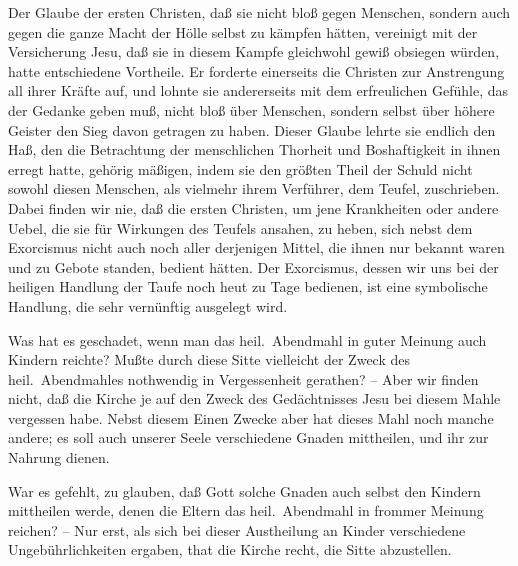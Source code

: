 \begin{aufza}
\item Der Glaube der ersten Christen, daß sie nicht bloß gegen Menschen, sondern auch gegen die ganze Macht der Hölle selbst zu kämpfen hätten, vereinigt mit der Versicherung Jesu, daß sie in diesem Kampfe gleichwohl gewiß obsiegen würden, hatte entschiedene Vortheile. Er forderte einerseits die Christen zur Anstrengung all ihrer Kräfte auf, und lohnte sie andererseits mit dem erfreulichen Gefühle, das der Gedanke geben muß, nicht bloß über Menschen, sondern selbst über höhere Geister den Sieg davon getragen zu haben. Dieser Glaube lehrte sie endlich den Haß, den die Betrachtung der menschlichen Thorheit und Boshaftigkeit in ihnen erregt hatte, gehörig mäßigen, indem sie den größten Theil der Schuld nicht sowohl diesen Menschen, als vielmehr ihrem Verführer, dem Teufel, zuschrieben. Dabei finden wir nie, daß die ersten Christen, um jene Krankheiten oder andere Uebel, die sie für Wirkungen des Teufels ansahen, zu heben, sich nebst dem Exorcismus nicht auch noch aller derjenigen Mittel, die ihnen nur bekannt waren und zu Gebote standen, bedient hätten. Der Exorcismus, dessen wir uns bei der heiligen Handlung der Taufe noch heut zu Tage bedienen, ist eine symbolische Handlung, die sehr vernünftig ausgelegt wird.~
\item Was hat es geschadet, wenn man das heil.\ Abendmahl in guter Meinung auch Kindern reichte? Mußte durch diese Sitte vielleicht der Zweck des heil.\ Abendmahles nothwendig in Vergessenheit gerathen? -- Aber wir finden nicht, daß die Kirche je auf den Zweck des Gedächtnisses Jesu bei diesem Mahle vergessen habe. Nebst diesem Einen Zwecke aber hat dieses Mahl noch manche andere; es soll auch unserer Seele verschiedene Gnaden mittheilen, und ihr zur Nahrung dienen.\par
War es gefehlt, zu glauben, daß Gott solche Gnaden auch selbst den Kindern mittheilen werde, denen die Eltern das heil.\ Abendmahl in frommer Meinung reichen? -- Nur erst, als sich bei dieser Austheilung an Kinder verschiedene Ungebührlichkeiten ergaben, that die Kirche recht, die Sitte abzustellen.
\end{aufza}


